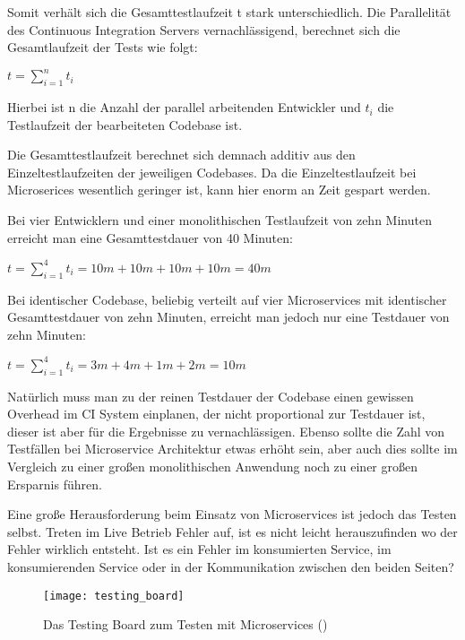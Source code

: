 Somit verhält sich die Gesamttestlaufzeit t stark unterschiedlich. Die Parallelität des Continuous Integration Servers vernachlässigend, berechnet sich die Gesamtlaufzeit der Tests wie folgt:

\begin{center}
$ t = \displaystyle\sum_{i=1}^{n} t_i $
\end{center}

\noindent Hierbei ist n die Anzahl der parallel arbeitenden Entwickler und $t_i$ die Testlaufzeit der bearbeiteten Codebase ist.

Die Gesamttestlaufzeit berechnet sich demnach additiv aus den Einzeltestlaufzeiten der jeweiligen Codebases. Da die Einzeltestlaufzeit bei Microserices wesentlich geringer ist, kann hier enorm an Zeit gespart werden.

Bei vier Entwicklern und einer monolithischen Testlaufzeit von zehn Minuten erreicht man eine Gesamttestdauer von 40 Minuten:

\begin{center}
$ t = \displaystyle\sum_{i=1}^{4} t_i = 10m + 10m + 10m + 10m = 40m $
\end{center}

\noindent Bei identischer Codebase, beliebig verteilt auf vier Microservices mit identischer Gesamttestdauer von zehn Minuten, erreicht man jedoch nur eine Testdauer von zehn Minuten:

\begin{center}
$ t = \displaystyle\sum_{i=1}^{4} t_i = 3m + 4m + 1m + 2m = 10m $
\end{center}

\noindent Natürlich muss man zu der reinen Testdauer der Codebase einen gewissen Overhead im CI System einplanen, der nicht proportional zur Testdauer ist, dieser ist aber für die Ergebnisse zu vernachlässigen. Ebenso sollte die Zahl von Testfällen bei Microservice Architektur etwas erhöht sein, aber auch dies sollte im Vergleich zu einer großen monolithischen Anwendung noch zu einer großen Ersparnis führen.

Eine große Herausforderung beim Einsatz von Microservices ist jedoch das Testen selbst. Treten im Live Betrieb Fehler auf, ist es nicht leicht herauszufinden wo der Fehler wirklich entsteht. Ist es ein Fehler im konsumierten Service, im konsumierenden Service oder in der Kommunikation zwischen den beiden Seiten?

\begin{wrapfigure}{l}{0.5\textwidth}
    \caption{Das Testing Board zum Testen mit Microservices (\cite{rails:soa})}
    \label{fig:testboard}
    \texttt{[image: testing\_board]}
\end{wrapfigure}


